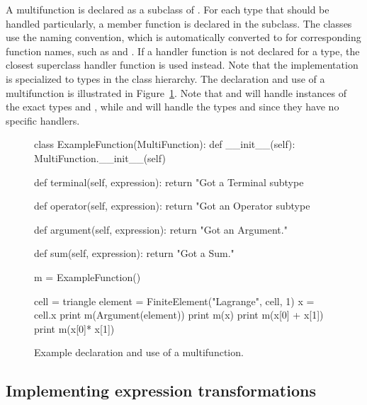A multifunction is declared as a subclass of . For each
type that should be handled particularly, a member function is declared
in the subclass.  The  classes use the  naming
convention, which is automatically converted to 
for corresponding function names, such as  and
.  If a handler function is not declared for a type,
the closest superclass handler function is used instead.  Note that
the  implementation is specialized to types in the
 class hierarchy.  The declaration and use of a multifunction
is illustrated in Figure~\ref{ufl:fig:examplefunction}.  Note that
 and  will handle instances of the exact types
 and , while  and 
will handle the types  and  since
they have no specific handlers.

\begin{figure}
\begin{python}
class ExampleFunction(MultiFunction):
    def __init__(self):
        MultiFunction.__init__(self)

    def terminal(self, expression):
        return "Got a Terminal subtype %

    def operator(self, expression):
        return "Got an Operator subtype %

    def argument(self, expression):
        return "Got an Argument."

    def sum(self, expression):
        return "Got a Sum."

m = ExampleFunction()

cell = triangle
element = FiniteElement("Lagrange", cell, 1)
x = cell.x
print m(Argument(element))
print m(x)
print m(x[0] + x[1])
print m(x[0]* x[1])
\end{python}
\caption{Example declaration and use of a multifunction.}
\label{ufl:fig:examplefunction}
\end{figure}
\subsection{Implementing expression transformations}
\label{ufl:sec:transformer}

